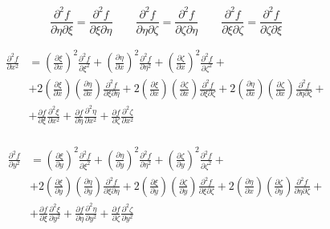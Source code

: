 \documentclass
[
a4paper,                      %
twoside,					  %
12pt,                         %
abstract,		      %
fleqn,                        %
]
{scrartcl} %
\begin{document}
\begin{description}
\begin{equation}
\frac{\partial^{2} f}{\partial\eta\partial\xi}=\frac{\partial^{2} f}{\partial\xi\partial\eta}\qquad\frac{\partial^{2} f}{\partial\eta\partial\zeta}=\frac{\partial^{2} f}{\partial\zeta\partial\eta}\qquad\frac{\partial^{2} f}{\partial\xi\partial\zeta}=\frac{\partial^{2} f}{\partial\zeta\partial\xi}
\end{equation}

\begin{equation}
\begin{aligned}
\frac{\partial^{2} f}{\partial x^{2}}&=\left(\frac{\partial\xi}{\partial x}\right)^{2}\frac{\partial^{2} f}{\partial\xi^{2}}+\left(\frac{\partial\eta}{\partial x}\right)^{2}\frac{\partial^{2} f}{\partial\eta^{2}}+\left(\frac{\partial\zeta}{\partial x}\right)^{2}\frac{\partial^{2} f}{\partial\zeta^{2}}+\\[5pt]
&+2\left(\frac{\partial\xi}{\partial x}\right)\left(\frac{\partial\eta}{\partial x}\right)\frac{\partial^{2} f}{\partial\xi\partial\eta}+2\left(\frac{\partial\xi}{\partial x}\right)\left(\frac{\partial\zeta}{\partial x}\right)\frac{\partial^{2} f}{\partial\xi\partial\zeta}+2\left(\frac{\partial\eta}{\partial x}\right)\left(\frac{\partial\zeta}{\partial x}\right)\frac{\partial^{2} f}{\partial\eta\partial\zeta}+\\[5pt]
&+\frac{\partial f}{\partial\xi}\frac{\partial^{2}\xi}{\partial x^{2}}+\frac{\partial f}{\partial\eta}\frac{\partial^{2}\eta}{\partial x^{2}}+\frac{\partial f}{\partial\zeta}\frac{\partial^{2}\zeta}{\partial x^{2}}\\
\end{aligned}
\end{equation}

\begin{equation}
\begin{aligned}
\frac{\partial^{2} f}{\partial y^{2}}&=\left(\frac{\partial\xi}{\partial y}\right)^{2}\frac{\partial^{2} f}{\partial\xi^{2}}+\left(\frac{\partial\eta}{\partial y}\right)^{2}\frac{\partial^{2} f}{\partial\eta^{2}}+\left(\frac{\partial\zeta}{\partial y}\right)^{2}\frac{\partial^{2} f}{\partial\zeta^{2}}+\\[5pt]
&+2\left(\frac{\partial\xi}{\partial y}\right)\left(\frac{\partial\eta}{\partial y}\right)\frac{\partial^{2} f}{\partial\xi\partial\eta}+2\left(\frac{\partial\xi}{\partial y}\right)\left(\frac{\partial\zeta}{\partial y}\right)\frac{\partial^{2} f}{\partial\xi\partial\zeta}+2\left(\frac{\partial\eta}{\partial x}\right)\left(\frac{\partial\zeta}{\partial y}\right)\frac{\partial^{2} f}{\partial\eta\partial\zeta}+\\[5pt]
&+\frac{\partial f}{\partial\xi}\frac{\partial^{2}\xi}{\partial y^{2}}+\frac{\partial f}{\partial\eta}\frac{\partial^{2}\eta}{\partial y^{2}}+\frac{\partial f}{\partial\zeta}\frac{\partial^{2}\zeta}{\partial y^{2}}\\
\end{aligned}
\end{equation}


\end{description}
\end{document}
